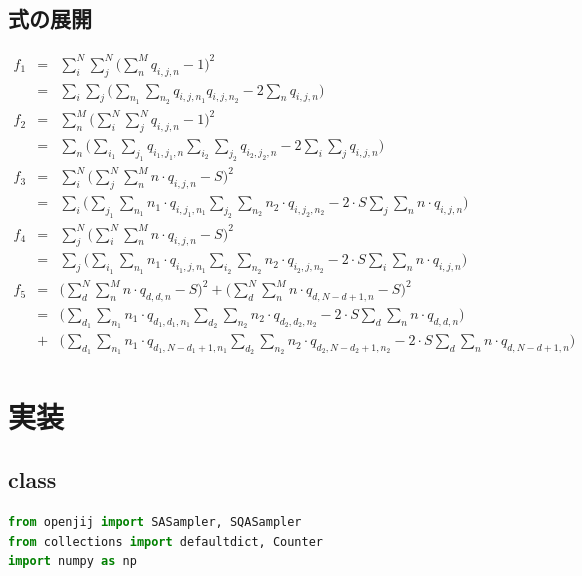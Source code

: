 \documentclass[uplatex,dvipdfmx,a4paper,11pt,oneside,openany]{jsbook}
\begin{document}
\subsection{式の展開}

\begin{eqnarray*}
  f_1 &=& \sum_i^N\sum_j^N\bigg(\sum_n^M q_{i,j,n} - 1\bigg)^2\\
  &=& \sum_i\sum_j\bigg(\sum_{n_1}\sum_{n_2}q_{i,j,n_1}q_{i,j,n_2} - 2 \sum_n q_{i,j,n}\bigg)\\
  f_2 &=& \sum_n^M\bigg(\sum_i^N\sum_j^N q_{i,j,n} - 1\bigg)^2\\
  &=& \sum_n\bigg(\sum_{i_1}\sum_{j_1}q_{i_1,j_1,n}\sum_{i_2}\sum_{j_2}q_{i_2,j_2,n} - 2 \sum_i\sum_j q_{i,j,n}\bigg)\\
  f_3 &=& \sum_i^N\bigg(\sum_j^N\sum_n^M n \cdot q_{i,j,n} - S\bigg)^2\\
  &=& \sum_i\bigg(\sum_{j_1}\sum_{n_1}n_1\cdot q_{i,j_1,n_1}\sum_{j_2}\sum_{n_2}n_2\cdot q_{i,j_2,n_2} - 2\cdot S\sum_j\sum_n n\cdot q_{i,j,n}\bigg)\\
  f_4 &=& \sum_j^N\bigg(\sum_i^N\sum_n^M n \cdot q_{i,j,n} - S\bigg)^2\\
  &=& \sum_j\bigg(\sum_{i_1}\sum_{n_1}n_1\cdot q_{i_1,j,n_1}\sum_{i_2}\sum_{n_2}n_2\cdot q_{i_2,j,n_2} - 2\cdot S\sum_i\sum_n n\cdot q_{i,j,n}\bigg)\\
  f_5 &=& \bigg(\sum_d^N\sum_n^M n\cdot q_{d,d,n} - S\bigg)^2 + \bigg(\sum_d^N\sum_n^M n \cdot q_{d,N-d+1,n} - S\bigg)^2\\
  &=& \bigg(\sum_{d_1}\sum_{n_1}n_1\cdot q_{d_1,d_1,n_1}\sum_{d_2}\sum_{n_2}n_2\cdot q_{d_2,d_2,n_2}-2\cdot S\sum_d\sum_n n\cdot q_{d,d,n}\bigg)\\
  &+& \bigg(\sum_{d_1}\sum_{n_1}n_1\cdot q_{d_1,N-d_1+1,n_1}\sum_{d_2}\sum_{n_2}n_2\cdot q_{d_2,N-d_2+1,n_2} - 2\cdot S\sum_d\sum_n n\cdot q_{d,N-d+1,n}\bigg)
\end{eqnarray*}

\section{実装}

\subsection{class}

\begin{lstlisting}[language=Python]
from openjij import SASampler, SQASampler
from collections import defaultdict, Counter
import numpy as np
\end{lstlisting}
\end{document}
